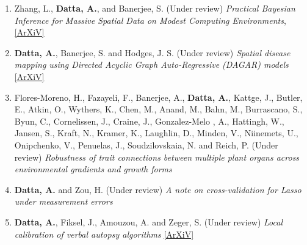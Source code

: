 \documentclass[11pt,a4paper,sans]{moderncv} %
\begin{document}
{\begin{enumerate}
\item \vskip 4mm Zhang, L., \textbf{Datta, A.}, and Banerjee, S. (Under review) {\em Practical Bayesian Inference for Massive Spatial Data on Modest Computing Environments}, \href{https://arxiv.org/pdf/1802.00495.pdf}{[ArXiV]}

\item \vskip 4mm \textbf{Datta, A.}, Banerjee, S. and Hodges, J. S. (Under review) {\em Spatial disease mapping using Directed Acyclic Graph Auto-Regressive (DAGAR) models} \href{https://arxiv.org/pdf/1704.07848.pdf}{[ArXiV]}

\item \vskip 2mm Flores-Moreno, H.,   Fazayeli, F.,   Banerjee, A.,   \textbf{Datta, A.},   Kattge, J.,   Butler, E.,   Atkin, O.,   Wythers, K.,   Chen, M.,   Anand, M.,   Bahn, M.,   Burrascano, S.,   Byun, C.,   Cornelissen, J.,   Craine, J.,   Gonzalez-Melo , A.,   Hattingh, W.,   Jansen, S.,   Kraft, N.,   Kramer, K.,   Laughlin, D.,   Minden, V.,  Niinemets, U.,   Onipchenko, V., Penuelas, J.,   Soudzilovskaia, N.   and   Reich, P. (Under review) {\em Robustness of trait connections between multiple plant organs across environmental gradients and growth forms}

\item \vskip 4mm \textbf{Datta, A.} and Zou, H. (Under review)  {\em A note on cross-validation for Lasso under measurement errors}

\item \vskip 4mm \textbf{Datta, A.}, Fiksel, J., Amouzou, A. and Zeger, S. (Under review) {\em Local calibration of verbal autopsy algorithms} \href{https://arxiv.org/pdf/1810.10572.pdf}{[ArXiV]}

%
%
%
%
%


\end{enumerate}}
\end{document}
